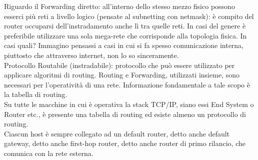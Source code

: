 \noindent Riguardo il Forwarding diretto: all'interno dello stesso mezzo fisico possono esserci più reti a livello logico (pensate al subnetting con netmask): è compito del router occuparsi dell'instradamento anche lì tra quelle reti. In casi del genere è preferibile utilizzare una sola mega-rete che corrisponde alla topologia fisica. In casi quali? Immagino pensassi a casi in cui si fa spesso comunicazione interna, piuttosto che attraverso internet, non lo so sinceramente.\\

\noindent Protocollo Routabile (instradabile): protocollo che può essere utilizzato per applicare algoritmi di routing. Routing e Forwarding, utilizzati insieme, sono necessari per l'operatività di una rete. Informazione fondamentale a tale scopo è la tabella di routing.\\

\noindent Su tutte le macchine in cui è operativa la stack TCP/IP, siano essi End System o Router etc., è presente una tabella di routing ed esiste almeno un protocollo di routing.\\

\noindent Ciascun host è sempre collegato ad un default router, detto anche default gateway, detto anche first-hop router, detto anche router di primo rilancio, che comunica con la rete esterna.\\

